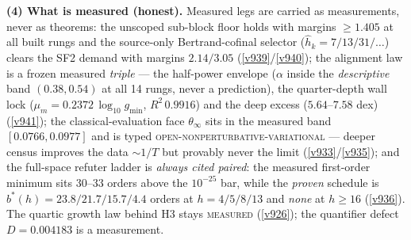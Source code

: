 \par\smallskip\noindent\textbf{(4) What is measured (honest).}  Measured legs are carried as
measurements, never as theorems: the unscoped sub-block floor holds with margins $\ge 1.405$ at
all built rungs and the source-only Bertrand-cofinal selector ($\hat h_k = 7/13/31/\ldots$)
clears the SF2 demand with margins $2.14/3.05$ (\vref{v939}/\vref{v940}); the alignment law is
a frozen measured \emph{triple} --- the half-power envelope ($\alpha$ inside the
\emph{descriptive} band $(0.38, 0.54)$ at all 14 rungs, never a prediction), the quarter-depth
wall lock ($\mu_m = 0.2372\,\log_{10} g_{\min}$, $R^2\,0.9916$) and the deep excess
($5.64$--$7.58$ dex) (\vref{v941}); the classical-evaluation face $\theta_\infty$ sits in the
measured band $[0.0766, 0.0977]$ and is typed \textsc{open-nonperturbative-variational} ---
deeper census improves the data ${\sim}1/T$ but provably never the limit
(\vref{v933}/\vref{v935}); and the full-space refuter ladder is \emph{always cited paired}: the
measured first-order minimum sits $30$--$33$ orders above the $10^{-25}$ bar, while the
\emph{proven} schedule is $b^*(h) = 23.8/21.7/15.7/4.4$ orders at $h = 4/5/8/13$ and \emph{none}
at $h \ge 16$ (\vref{v936}).  The quartic growth law behind H3 stays \textsc{measured}
(\vref{v926}); the quantifier defect $D = 0.004183$ is a measurement.


